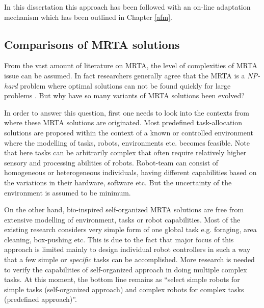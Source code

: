 In this dissertation  this approach has been followed with an on-line adaptation mechanism which has been outlined in Chapter \ref{afm}.                                                                                                                                                                                                                                                                                                                                                                                                                                                                                                                                                                                                                                                                                                                            
\subsection{Comparisons of MRTA solutions}
From the vast amount of literature on MRTA, the level of complexities of MRTA issue can be assumed. In fact researchers generally agree that the MRTA is a {\em NP-hard} problem where optimal solutions can not be found quickly for large problems \cite{Gerkey+2004,Parker2008}. But why have so many variants of MRTA solutions been evolved? 

In order to answer this question, first one needs to look into the contexts from where these MRTA solutions are originated. Most predefined task-allocation solutions are proposed within the context of a known or controlled environment where the modelling of tasks, robots, environments etc. becomes feasible. Note that here tasks can be arbitrarily complex that often require relatively higher sensory and processing abilities of robots. Robot-team can consist of homogeneous or heterogeneous individuals, having different capabilities based on the variations in their hardware, software etc. But the uncertainty of the environment is assumed to be minimum. 

On the other hand, bio-inspired self-organized MRTA solutions are free from extensive modelling of environment, tasks or robot capabilities. Most of the existing research considers very simple form of one global task e.g. foraging, area cleaning, box-pushing etc. This is due to the fact that major focus of this approach is limited mainly to design individual robot controllers in such a way that a few simple  or {\em specific} tasks can be accomplished. More research is needed to verify the capabilities of self-organized approach in doing multiple complex tasks. At this moment, the bottom line remains as ``select simple robots for simple tasks (self-organized approach) and complex robots for complex tasks (predefined approach)''.

